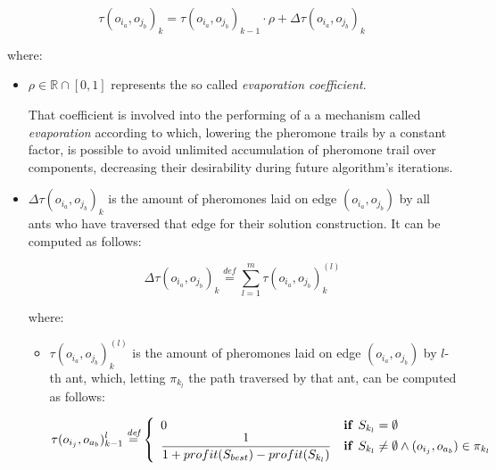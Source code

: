 \documentclass[12pt,a4paper]{report}
\newcommand{\mathDef}{\overset{\textit{def}}{=}}
\theoremstyle{definition}
\begin{document}
\begin{equation}
	\tau(o_{i_a}, o_{j_b})_k = \tau(o_{i_a}, o_{j_b})_{k-1} \cdot \rho + \Delta \tau(o_{i_a}, o_{j_b})_{k} 
\end{equation}

where:

\begin{itemize}
	
	\item $\rho \in \mathbb{R} \cap \left[0,1\right]$ represents the so called \textit{evaporation coefficient}. 
	
	That coefficient is involved into the performing of a a mechanism called \textit{evaporation} according to which, lowering the pheromone trails by a constant factor, is possible to avoid unlimited accumulation of pheromone trail over components, decreasing their desirability during future algorithm's iterations.
	
	\item $\Delta \tau(o_{i_a}, o_{j_b})_{k}$ is the amount of pheromones laid on edge $(o_{i_a}, o_{j_b})$ by all ants who have traversed that edge for their solution construction. It can be computed as follows:
	
	\begin{equation}
		\Delta \tau(o_{i_a}, o_{j_b})_{k} \mathDef \sum_{l=1}^{m} \tau(o_{i_a}, o_{j_b})_k^{(l)}
	\end{equation}
	
	where: 
	
	\begin{itemize}
		\item $\tau(o_{i_a}, o_{j_b})_k^{(l)}$ is the amount of pheromones laid on edge $(o_{i_a}, o_{j_b})$ by $l$-th ant, which, letting $\pi_{k_l}$ the path traversed by that ant, can be computed as follows:
		
		\begin{equation}
			\tau(o_{i_j}, o_{a_b})_{k-1}^{l} \mathDef \left\{ 
			\begin{array}{ll}
				0 & \text{\textbf{if }} S_{k_l} = \emptyset \\ 
				\displaystyle \frac{1}{1 + profit(S_{best}) - profit(S_{k_l})} & \text{\textbf{if }} S_{k_l} \neq \emptyset \wedge (o_{i_j}, o_{a_b}) \in \pi_{k_l} \\ 
			\end{array} \right.
		\end{equation}
		
		
	\end{itemize}
\end{itemize}
\end{document}
